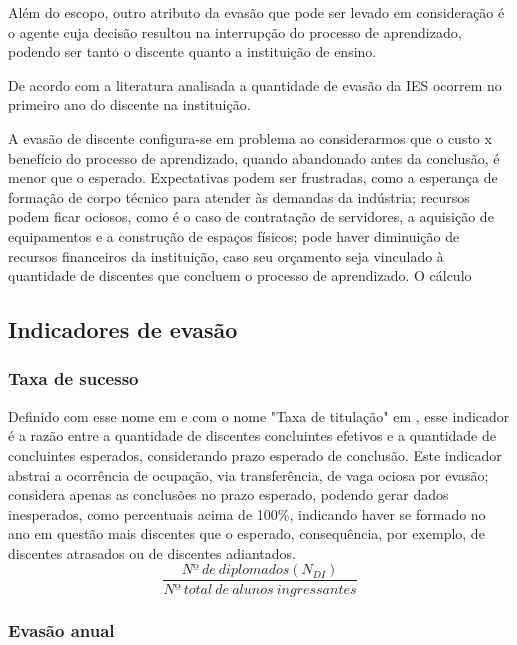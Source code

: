 \documentclass{report}
\begin{document}
Além do escopo, outro atributo da evasão que pode ser levado em consideração é o agente cuja decisão resultou na interrupção do processo de aprendizado, podendo ser tanto o discente quanto a instituição de ensino.

De acordo com a literatura analisada \cite{tinto_leaving} \cite{evasao_panorama} a quantidade de evasão da IES ocorrem no primeiro ano do discente na instituição.

A evasão de discente configura-se em problema ao considerarmos que o custo x benefício do processo de aprendizado, quando abandonado antes da conclusão, é menor que o esperado. Expectativas podem ser frustradas, como a esperança de formação de corpo técnico para atender às demandas da indústria; recursos podem ficar ociosos, como é o caso de contratação de servidores, a aquisição de equipamentos e a construção de espaços físicos; pode haver diminuição de recursos financeiros da instituição, caso seu orçamento seja vinculado à quantidade de discentes que concluem o processo de aprendizado. O cálculo 

\subsection{Indicadores de evasão}

\subsubsection{Taxa de sucesso}

Definido com esse nome em \cite{indicadores_TCU} e com o nome "Taxa de titulação" em \cite{mudanca_calculos}, esse indicador é a razão entre a quantidade de discentes concluintes efetivos e a quantidade de concluintes esperados, considerando prazo esperado de conclusão.
Este indicador abstrai a ocorrência de ocupação, via transferência, de vaga ociosa por evasão; considera apenas as conclusões no prazo esperado, podendo gerar dados inesperados, como percentuais acima de 100\%, indicando haver se formado no ano em questão mais discentes que o esperado, consequência, por exemplo, de discentes atrasados ou de discentes adiantados.
\begin{equation}
\frac{Nº\ de\ diplomados(N_{DI})}{Nº\ total\ de\ alunos\ ingressantes}
\end{equation}

\subsubsection{Evasão anual}
\end{document}
